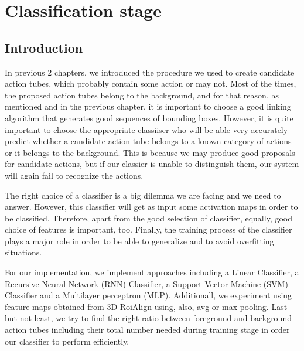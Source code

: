 \documentclass{report}
\begin{document}
\chapter{Classification stage}
\section{Introduction}
In previous 2 chapters, we introduced the procedure we used to create
candidate action tubes, which probably contain some action or may not.
Most of the times, the proposed action tubes belong to the background, and for that reason, as mentioned
and in the previous chapter, it is important to choose a good linking algorithm that generates good sequences of bounding
boxes. However, it is quite important to choose the appropriate classiiser who will be able
very accurately predict whether a candidate action tube belongs to a known category of actions or
it belongs to the background. This is because we may produce good proposals for candidate actions, but if our classier
is unable to distinguish them, our system will again fail to recognize the actions. \par

The right choice of a classifier is a big dilemma we are facing and we need to answer. However, this classifier will get as input
some activation maps in order to be classified. Therefore, apart from the good selection of classifier, equally, 
good choice of features is important, too. Finally, the training process of the classifier plays a major role in order to 
be able to generalize and to avoid overfitting situations. \par

For our implementation, we implement approaches including a Linear Classifier, 
a Recursive Neural Network (RNN) Classifier, a Support Vector Machine (SVM) Classifier and a Multilayer perceptron (MLP).
Additionall, we experiment using feature maps obtained from 3D RoiAlign using, also, avg or max pooling. Last but not least, we try to
find the right ratio between foreground and background action tubes including their total number needed during training stage
in order our classifier to perform efficiently.
\end{document}
